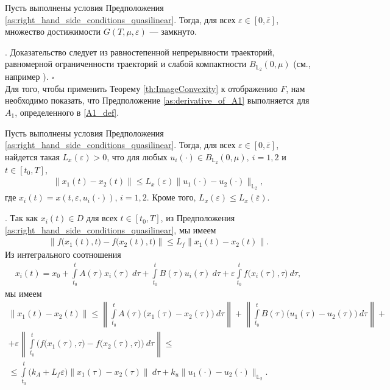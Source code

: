 \documentclass[../main.tex]{subfiles}
\begin{document}
\begin{utv}\label{ReachableSetcloseness}
    Пусть выполнены условия Предположения \ref{as:right_hand_side_conditions_quasilinear}. Тогда, для всех $\varepsilon\in [0,\overline{\varepsilon}]$, множество достижимости $G(T,\mu,\varepsilon) $ --- замкнуто.
\end{utv}
\doc. 
Доказательство следует из равностепенной непрерывности траекторий, равномерной ограниченности траекторий и слабой компактности $B_{\mathbb{L}_2}(0,\mu)$ (см., например \cite{GusZyk}).
\hfill$\square$\\[1ex]%

Для того, чтобы применить Теорему \ref{th:ImageConvexity} к отображению $F$,  нам необходимо показать, что Предположение \ref{as:derivative_of_A1} выполняется для $A_1$, определенного в \eqref{A1_def}.
\begin{lemma}\label{lem:Lipx}
    Пусть выполнены условия Предположения \ref{as:right_hand_side_conditions_quasilinear}. Тогда, для всех $\varepsilon\in [0,\overline{\varepsilon}]$, найдется такая $L_x(\varepsilon) > 0$, что для любых $u_i(\cdot) \in B_{\mathbb{L}_2}(0,\mu), \ i = 1,2$ и $t \in [t_0,T]$, 
    \begin{gather*}
        \| x_1(t) - x_2(t) \| \leqslant L_x(\varepsilon) \| u_1(\cdot) - u_2(\cdot) \|_{\mathbb{L}_2},
    \end{gather*}
    где $x_i(t) = x(t,\varepsilon,u_i(\cdot))$, $i = 1,2$. Кроме того, $L_x(\varepsilon) \leqslant L_x(\overline{\varepsilon})$. 
\end{lemma}
\doc.
Так как $x_i(t) \in D$ для всех $t\in [t_0,T]$, из Предположения \ref{as:right_hand_side_conditions_quasilinear}, мы имеем
\begin{gather*}
    \|f\big(x_1(t),t\big) - f\big(x_2(t),t\big)\| \leqslant L_f\|x_1(t) -  x_2(t)\|.
\end{gather*}
Из интегрального соотношения
\begin{gather}\label{nonlinear_solution}
    x_i(t) = x_0 + \int\limits_{t_0}^t A(\tau)x_i(\tau)\ d\tau + \int\limits_{t_0}^t B(\tau)u_i(\tau)\ d\tau+
    \varepsilon\int\limits_{t_0}^t f\big(x_i(\tau),\tau\big)\ d\tau,
\end{gather}
мы имеем
\begin{gather*}
    \| x_1(t) - x_2(t) \| \leqslant
    \left\| \int\limits_{t_0}^t A(\tau)\big(x_1(\tau) - x_2(\tau)\big)\ d\tau \right\| + 
    \left\|\int\limits_{t_0}^t B(\tau) \big(u_1(\tau) - u_2(\tau)\big)\ d\tau   \right\| + \\ +
    \varepsilon \left\| \int\limits_{t_0}^t \Big( f\big(x_1(\tau),\tau\big) - f\big(x_2(\tau),\tau\big) \Big)\ d\tau   \right\|  
    \leqslant \\ \leqslant
    \int\limits_{t_0}^t \big(k_A + L_f \varepsilon) \left\| x_1(\tau) - x_2(\tau)\right\| \ d\tau + k_u \| u_1(\cdot) - u_2(\cdot) \|_{\mathbb{L}_2}.
\end{gather*}
\end{document}
